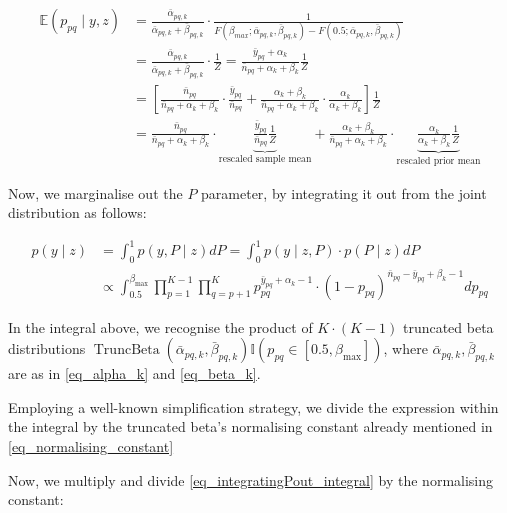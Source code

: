 \documentclass[11pt]{amsart}
\begin{document}
\begin{align}
\mathbb{E}\left(p_{pq}\mid y,z\right) &= \frac{\bar{\alpha}_{pq,k}}{\bar{\alpha}_{pq,k}+\bar{\beta}_{pq,k}} \cdot \frac{1}{F(\beta_{max};\bar{\alpha}_{pq,k},\bar{\beta}_{pq,k}) - F(0.5;\bar{\alpha}_{pq,k},\bar{\beta}_{pq,k})} \nonumber \\
&= \frac{\bar{\alpha}_{pq,k}}{\bar{\alpha}_{pq,k}+\bar{\beta}_{pq,k}} \cdot \frac{1}{Z} = \frac{\bar{y}_{pq}+\alpha_k}{\bar{n}_{pq}+ \alpha_k +\beta_k} \frac{1}{Z} \nonumber \\
&= \left[ \frac{\bar{n}_{pq}}{\bar{n}_{pq}+ \alpha_k +\beta_k} \cdot \frac{\bar{y}_{pq}}{\bar{n}_{pq}} + \frac{\alpha_k +\beta_k}{\bar{n}_{pq}+ \alpha_k +\beta_k} \cdot \frac{\alpha_k}{\alpha_k +\beta_k} \right ] \frac{1}{Z} \nonumber \\
&= \frac{\bar{n}_{pq}}{\bar{n}_{pq}+ \alpha_k +\beta_k} \cdot \underbrace{\frac{\bar{y}_{pq}}{\bar{n}_{pq}} \frac{1}{Z}}_\text{rescaled sample mean}
+ \frac{\alpha_k +\beta_k}{\bar{n}_{pq}+ \alpha_k +\beta_k} \cdot \underbrace{\frac{\alpha_k}{\alpha_k +\beta_k}\frac{1}{Z}}_\text{rescaled prior mean}
 \end{align}

Now, we marginalise out the $P$ parameter, by integrating it out from the joint distribution as follows:

\begin{align}
p \left(y \mid z \right)&= \int_0^1 p\left(y, P \mid z\right) d P =\int_0^1 p \left(y \mid z, P\right) \cdot p(P \mid z) d P \\
& \propto \int_{0.5}^{\beta_{\max}} \prod_{p=1}^{K-1}\prod_{q= p+1}^{K} p_{pq}^{\bar{y}_{pq}+\alpha_k-1} \cdot\left(1-p_{pq}\right)^{\bar{n}_{pq}-\bar{y}_{pq}+\beta_k -1} dp_{pq}
 \label{eq_integratingPout_integral}
\end{align}

In the integral above, we recognise the product of $K \cdot \left( K -1 \right)$ truncated beta distributions $\operatorname{TruncBeta}\left(\bar{\alpha}_{pq,k},\bar{\beta}_{pq,k}\right)\mathbb{I}\left(p_{pq} \in \left[0.5,\beta_{\max}\right] \right)$, where $\bar{\alpha}_{pq,k},\bar{\beta}_{pq,k}$ are as in \eqref{eq_alpha_k} and \eqref{eq_beta_k}.

Employing a well-known simplification strategy, we divide the expression within the integral by the truncated beta's normalising constant already mentioned in \eqref{eq_normalising_constant}

Now, we multiply and divide \eqref{eq_integratingPout_integral} by the normalising constant:
\end{document}
